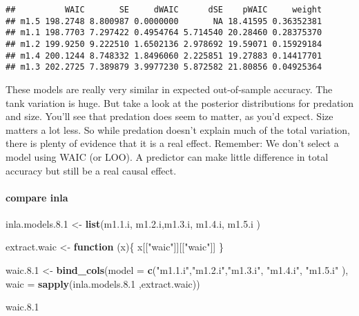 \documentclass[
]{article}
\newenvironment{Shaded}{\begin{snugshade}}{\end{snugshade}}
\newcommand{\ControlFlowTok}[1]{\textcolor[rgb]{0.13,0.29,0.53}{\textbf{#1}}}
\newcommand{\DataTypeTok}[1]{\textcolor[rgb]{0.13,0.29,0.53}{#1}}
\newcommand{\FloatTok}[1]{\textcolor[rgb]{0.00,0.00,0.81}{#1}}
\newcommand{\KeywordTok}[1]{\textcolor[rgb]{0.13,0.29,0.53}{\textbf{#1}}}
\newcommand{\NormalTok}[1]{#1}
\newcommand{\StringTok}[1]{\textcolor[rgb]{0.31,0.60,0.02}{#1}}
\begin{document}
\begin{verbatim}
##          WAIC       SE     dWAIC      dSE    pWAIC     weight
## m1.5 198.2748 8.800987 0.0000000       NA 18.41595 0.36352381
## m1.1 198.7703 7.297422 0.4954764 5.714540 20.28460 0.28375370
## m1.2 199.9250 9.222510 1.6502136 2.978692 19.59071 0.15929184
## m1.4 200.1244 8.748332 1.8496060 2.225851 19.27883 0.14417701
## m1.3 202.2725 7.389879 3.9977230 5.872582 21.80856 0.04925364
\end{verbatim}

These models are really very similar in expected out-of-sample accuracy.
The tank variation is huge. But take a look at the posterior
distributions for predation and size. You'll see that predation does
seem to matter, as you'd expect. Size matters a lot less. So while
predation doesn't explain much of the total variation, there is plenty
of evidence that it is a real effect. Remember: We don't select a model
using WAIC (or LOO). A predictor can make little difference in total
accuracy but still be a real causal effect.

\hypertarget{compare-inla}{%
\paragraph{compare inla}\label{compare-inla}}

\begin{Shaded}
\begin{Highlighting}[]
\NormalTok{inla.models.}\FloatTok{8.1}\NormalTok{ <-}\StringTok{ }\KeywordTok{list}\NormalTok{(m1.}\FloatTok{1.}\NormalTok{i, m1.}\FloatTok{2.}\NormalTok{i,m1.}\FloatTok{3.}\NormalTok{i, m1.}\FloatTok{4.}\NormalTok{i, m1.}\FloatTok{5.}\NormalTok{i )}

\NormalTok{extract.waic <-}\StringTok{ }\ControlFlowTok{function}\NormalTok{ (x)\{}
\NormalTok{  x[[}\StringTok{"waic"}\NormalTok{]][[}\StringTok{"waic"}\NormalTok{]]}
\NormalTok{\}}

\NormalTok{waic.}\FloatTok{8.1}\NormalTok{ <-}\StringTok{ }\KeywordTok{bind_cols}\NormalTok{(}\DataTypeTok{model =} \KeywordTok{c}\NormalTok{(}\StringTok{"m1.1.i"}\NormalTok{,}\StringTok{"m1.2.i"}\NormalTok{,}\StringTok{"m1.3.i"}\NormalTok{, }\StringTok{"m1.4.i"}\NormalTok{, }\StringTok{"m1.5.i"}\NormalTok{ ), }\DataTypeTok{waic =} \KeywordTok{sapply}\NormalTok{(inla.models.}\FloatTok{8.1}\NormalTok{ ,extract.waic))}

\NormalTok{waic.}\FloatTok{8.1}
\end{Highlighting}
\end{Shaded}
\end{document}
